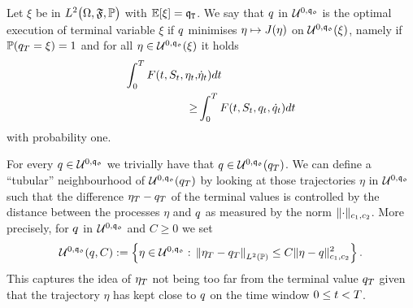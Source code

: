 \documentclass[10pt,a4paper]{article}
\begin{document}
\begin{defi}\label{defi.optimalExecutionOfSpecifiedTerminalVariable}
Let $\xi$ be in $\Ltwo \probabilitySpace$ with $\Expectation[\xi] = \liquidationTarget$. We say that $\inventory$ in $\spaceUnbiasedInventoryTrajectoriesInitialConstraint$ is the optimal execution of terminal variable $\xi$ if $\inventory$ minimises $\eta \mapsto \costFunctional(\eta)$ on $\spaceUnbiasedInventoryTrajectoriesInitialConstraint(\xi)$, namely if $ \Prob(\inventory_\timeHorizon =\xi)=1 $ and for all $\eta \in \spaceUnbiasedInventoryTrajectoriesInitialConstraint(\xi)$ it holds
\begin{equation*}
\begin{split}
\intZeroTimeHorizon F(t,\fundamentalPrice_t,\eta_t,&\dotEta_t )dt \\
\geq & \intZeroTimeHorizon F(t,\fundamentalPrice_t, \inventory_t ,\inventoryRate_t )dt
\end{split}
\end{equation*}
with probability one.
\end{defi}
For every $\inventory \in \spaceUnbiasedInventoryTrajectoriesInitialConstraint$ we trivially have that $\inventory \in \spaceUnbiasedInventoryTrajectoriesInitialConstraint(\inventory_\timeHorizon)$. We can define a ``tubular'' neighbourhood of $\spaceUnbiasedInventoryTrajectoriesInitialConstraint(\inventory_\timeHorizon) $ by looking at those trajectories $\eta$ in $\spaceUnbiasedInventoryTrajectoriesInitialConstraint$ such that the difference $\eta_\timeHorizon - \inventory_\timeHorizon$ of the terminal values is controlled by the distance between the processes $\eta$ and $\inventory$ as measured by the norm $\normInventoryTrjectories{\cdot}$. More precisely, for $\inventory$ in $\spaceUnbiasedInventoryTrajectoriesInitialConstraint$ and $C\geq 0$ we set 
\begin{equation}\label{eq.staticTubularNeighbourhoodIC}
\spaceUnbiasedInventoryTrajectoriesInitialConstraint(\inventory,C):=
\left\lbrace
\eta \in \spaceUnbiasedInventoryTrajectoriesInitialConstraint: \, 
\norm[\eta_\timeHorizon-\inventory_\timeHorizon ]_{\Ltwo(\Prob)} \leq 
C \normInventoryTrjectories{\eta -\inventory}\squared 
\right\rbrace.
\end{equation}
This captures the idea of $\eta_\timeHorizon$ not being too far from the terminal value $\inventory_\timeHorizon$ given that the trajectory $\eta$  has kept close to $\inventory$ on the time window $0\leq t<\timeHorizon$.
\end{document}
